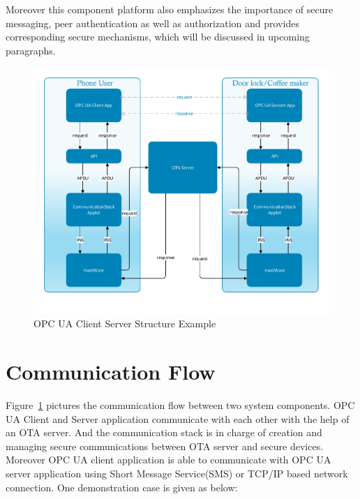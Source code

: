 Moreover this component platform also emphasizes the importance of secure messaging, peer authentication as well as authorization and provides corresponding secure mechanisms, which will be discussed in upcoming paragraphs.

 \begin{figure}[!htb]
	\centering
	\includegraphics[width=1.1\textwidth]{csoverview}
		\caption{OPC UA Client Server Structure Example}
	\label{fig:softwareStructure}
\end{figure}

\section{Communication Flow}
Figure~\ref{fig:softwareStructure} pictures the communication flow between two system components. OPC UA Client and Server application communicate with each other with the help of an OTA server. And the communication stack is in charge of creation and managing secure communications between OTA server and secure devices. Moreover OPC UA client application is able to communicate with OPC UA server application using Short Message Service(SMS) or TCP/IP based network connection. One demonstration case is given as below:

